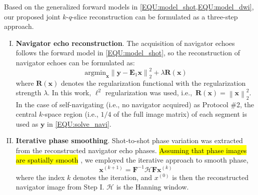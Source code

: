 \documentclass[preprint,12pt,authoryear,review]{elsarticle}
\begin{document}
    Based on the generalized forward models in \cref{EQU:model_shot,EQU:model_dwi},
    our proposed joint $k$-$q$-slice reconstruction can be formulated as a three-step approach.

    \begin{enumerate}[I.]
        \item \textbf{Navigator echo reconstruction}.
        The acquisition of navigator echoes follows the forward model
        in \cref{EQU:model_shot}, so the reconstruction of navigator echoes
        can be formulated as:
        \begin{equation}
            \mathrm{argmin}_\mathbf{x} \left\| \mathbf{y} - \mathbf{E}_1 \mathbf{x} \right\|_2^2
            + \lambda \mathbf{R}(\mathbf{x})
            \label{EQU:solve_navi}
        \end{equation}
    	where $\mathbf{R}(\mathbf{x})$ denotes the regularization functional
    	with the regularization strength $\lambda$.
    	In this work, $\ell^2$ regularization was used,
    	i.e.,~$\mathbf{R}(\mathbf{x}) = \left\lVert \mathbf{x} \right\rVert_2^2$.
        In the case of self-navigating (i.e., no navigator acquired) as Protocol \#2,
        the central $k$-space region (i.e., $1/4$ of the full image matrix)
        of each segment is used as $\mathbf{y}$ in \cref{EQU:solve_navi}.

        \item \textbf{Iterative phase smoothing}.
        Shot-to-shot phase variation was extracted from
        the reconstructed navigator echo phases.
        \hl{Assuming that phase images are spatially smooth}
        \citep{chen_2013_muse,dai_2023_julep},
        we employed the iterative approach to smooth phase,
        \begin{equation}
        	\mathbf{x}^{(k+1)} = \mathbf{F}^{-1} \mathcal{H} \mathbf{F} \mathbf{x}^{(k)}
        	\label{EQU:ITER_PHASE}
        \end{equation}
    	where the index $k$ denotes the iteration,
    	and $x^{(0)}$ is then the reconstructed navigator image from Step I.
    	$\mathcal{H}$ is the Hanning window.


\end{enumerate}
\end{document}
